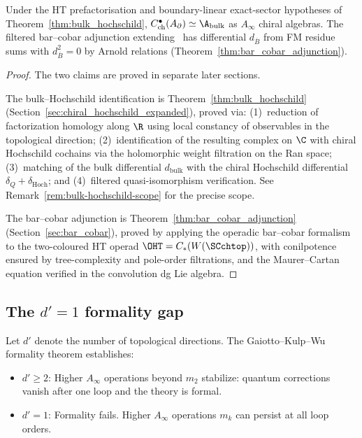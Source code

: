\begin{theorem}
\label{thm:bulk-hochschild-roadmap}
Under the HT prefactorisation and boundary-linear exact-sector
hypotheses of Theorem~\ref{thm:bulk_hochschild},
$C^\bullet_{\mathrm{ch}}(A_\partial) \simeq \A_{\text{bulk}}$ as
$A_\infty$ chiral algebras. The filtered bar--cobar adjunction
extending~\cite{GLZ22} has differential $d_{\overline{B}}$ from FM
residue sums with $d_{\overline{B}}^2 = 0$ by Arnold relations
(Theorem~\ref{thm:bar_cobar_adjunction}).
\end{theorem}

\begin{proof}
The two claims are proved in separate later sections.

The bulk--Hochschild identification is Theorem~\ref{thm:bulk_hochschild} (Section~\ref{sec:chiral_hochschild_expanded}), proved via: (1)~reduction of factorization homology along $\R$ using local constancy of observables in the topological direction; (2)~identification of the resulting complex on $\C$ with chiral Hochschild cochains via the holomorphic weight filtration on the Ran space; (3)~matching of the bulk differential $d_{\mathrm{bulk}}$ with the chiral Hochschild differential $\delta_Q + \delta_{\mathrm{Hoch}}$; and (4)~filtered quasi-isomorphism verification. See Remark~\ref{rem:bulk-hochschild-scope} for the precise scope.

The bar--cobar adjunction is Theorem~\ref{thm:bar_cobar_adjunction} (Section~\ref{sec:bar_cobar}), proved by applying the operadic bar--cobar formalism to the two-coloured HT operad $\OHT = C_\ast(W(\SCchtop))$, with conilpotence ensured by tree-complexity and pole-order filtrations, and the Maurer--Cartan equation verified in the convolution dg Lie algebra.
\end{proof}

\label{sec:bridge-inputs-summary}

\subsection{The $d'=1$ formality gap}

Let $d'$ denote the number of topological directions. The Gaiotto--Kulp--Wu formality theorem \cite{GKW25} establishes:

\begin{itemize}
\item \textbf{$d' \geq 2$}: Higher $A_\infty$ operations beyond $m_2$ stabilize: quantum corrections vanish after one loop and the theory is formal.

\item \textbf{$d' = 1$}: Formality fails. Higher $A_\infty$ operations $m_k$ can persist at all loop orders.
\end{itemize}

